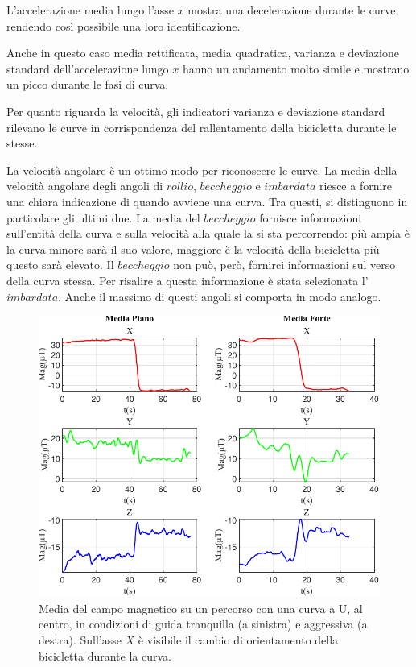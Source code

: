 \documentclass[class=article]{standalone}
\begin{document}
	
	L'accelerazione media lungo l'asse \(x\) mostra una decelerazione durante le curve, rendendo così possibile una loro identificazione.
	
	Anche in questo caso media rettificata, media quadratica, varianza e deviazione standard dell'accelerazione lungo \(x\) hanno un andamento molto simile e mostrano un picco durante le fasi di curva.\hfill\break
	
	Per quanto riguarda la velocità, gli indicatori varianza e deviazione standard rilevano le curve in corrispondenza del rallentamento della bicicletta durante le stesse.\hfill\break
	
	La velocità angolare è un ottimo modo per riconoscere le curve. La media della velocità angolare degli angoli di \(rollio\), \(beccheggio\) e \(imbardata\) riesce a fornire una chiara indicazione di quando avviene una curva. Tra questi, si distinguono in particolare gli ultimi due. La media del \(beccheggio\) fornisce informazioni sull'entità della curva e sulla velocità alla quale la si sta percorrendo: più ampia è la curva minore sarà il suo valore, maggiore è la velocità della bicicletta più questo sarà elevato. Il \(beccheggio\) non può, però, fornirci informazioni sul verso della curva stessa. Per risalire a questa informazione è stata selezionata l'\(imbardata\). Anche il massimo di questi angoli si comporta in modo analogo.
	
	\begin{center}
		\begin{figure}[h!]
			\centering\includegraphics[width=.7\textwidth]{img/CurvaUFP/Mag/Media}
			\caption[]{Media del campo magnetico su un percorso con una curva a U, al centro, in condizioni di guida tranquilla (a sinistra) e aggressiva (a destra). Sull'asse \(X\) è visibile il cambio di orientamento della bicicletta durante la curva.}
			\label{fig:MagMedia_CurvaUFP}
		\end{figure}
	\end{center}
	
\end{document}
